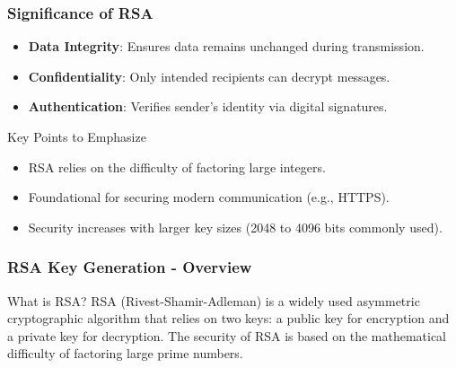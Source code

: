 \documentclass{beamer}
\begin{document}
\begin{frame}[fragile]
    \frametitle{Significance of RSA}
    \begin{itemize}
        \item \textbf{Data Integrity}: Ensures data remains unchanged during transmission.
        \item \textbf{Confidentiality}: Only intended recipients can decrypt messages.
        \item \textbf{Authentication}: Verifies sender's identity via digital signatures.
    \end{itemize}

    \begin{block}{Key Points to Emphasize}
        \begin{itemize}
            \item RSA relies on the difficulty of factoring large integers.
            \item Foundational for securing modern communication (e.g., HTTPS).
            \item Security increases with larger key sizes (2048 to 4096 bits commonly used).
        \end{itemize}
    \end{block}
\end{frame}

\begin{frame}[fragile]
    \frametitle{RSA Key Generation - Overview}
    \begin{block}{What is RSA?}
        RSA (Rivest-Shamir-Adleman) is a widely used asymmetric cryptographic algorithm that relies on two keys: 
        a public key for encryption and a private key for decryption. 
        The security of RSA is based on the mathematical difficulty of factoring large prime numbers.
    \end{block}
\end{frame}
\end{document}
